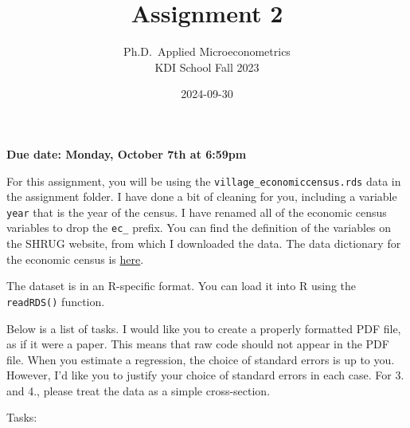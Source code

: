 \documentclass[
]{article}
\title{Assignment 2}
\subtitle{Ph.D.~Applied Microeconometrics\\
KDI School Fall 2023}
\author{}
\date{\vspace{-2.5em}2024-09-30}
\begin{document}
\maketitle

\textbf{Due date: Monday, October 7th at 6:59pm}

For this assignment, you will be using the \texttt{village\_economiccensus.rds} data in the assignment folder. I have done a bit of cleaning for you, including a variable \texttt{year} that is the year of the census. I have renamed all of the economic census variables to drop the \texttt{ec\_} prefix. You can find the definition of the variables on the SHRUG website, from which I downloaded the data. The data dictionary for the economic census is \href{https://docs.devdatalab.org/SHRUG-Metadata/Economic\%20Census/Tables/ec90-metadata/}{\textcolor{kdisgreen}{here}}.

The dataset is in an R-specific format. You can load it into R using the \texttt{readRDS()} function.

Below is a list of tasks. I would like you to create a properly formatted PDF file, as if it were a paper. This means that raw code should not appear in the PDF file. When you estimate a regression, the choice of standard errors is up to you. However, I'd like you to justify your choice of standard errors in each case. For 3. and 4., please treat the data as a simple cross-section.

Tasks:
\end{document}
